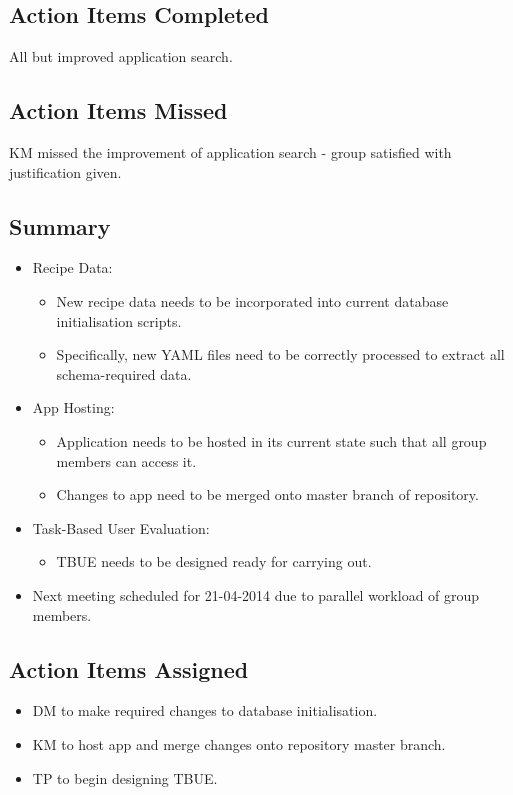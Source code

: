 \documentclass{article}
\begin{document}
\subsection*{Action Items Completed}
All but improved application search.

\subsection*{Action Items Missed}
KM missed the improvement of application search - group satisfied with justification given.

\subsection*{Summary}
\begin{itemize}
\item Recipe Data:
  \begin{itemize}
  \item New recipe data needs to be incorporated into current database initialisation scripts.
  \item Specifically, new YAML files need to be correctly processed to extract all schema-required data.
  \end{itemize}
\item App Hosting:
  \begin{itemize}
  \item Application needs to be hosted in its current state such that all group members can access it.
  \item Changes to app need to be merged onto master branch of repository.
  \end{itemize}
\item Task-Based User Evaluation:
  \begin{itemize}
  \item TBUE needs to be designed ready for carrying out.
  \end{itemize}
\item Next meeting scheduled for 21-04-2014 due to parallel workload of group members.
\end{itemize}

\subsection*{Action Items Assigned}
\begin{itemize}
\item DM to make required changes to database initialisation.
\item KM to host app and merge changes onto repository master branch.
\item TP to begin designing TBUE.
\end{itemize}
\end{document}
